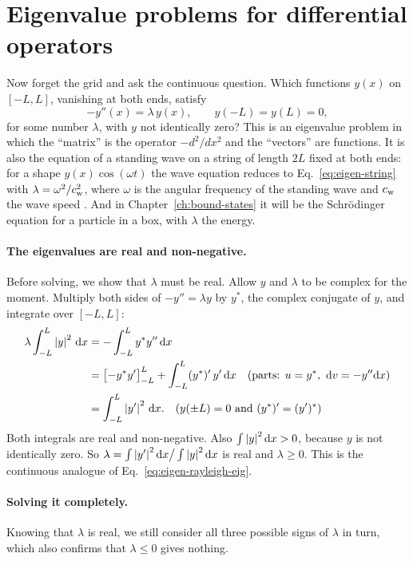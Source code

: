 \section{Eigenvalue problems for differential operators}\label{sec:eigen-ode}

Now forget the grid and ask the continuous question. Which functions $y(x)$ on $[-L,L]$, vanishing at both ends, satisfy
\begin{equation}
-y''(x)=\lambda\,y(x),\qquad y(-L)=y(L)=0,
\label{eq:eigen-string}
\end{equation}
for some number $\lambda$, with $y$ not identically zero? This is an eigenvalue problem in which the ``matrix'' is the operator $-d^2/dx^2$ and the ``vectors'' are functions. It is also the equation of a standing wave on a string of length $2L$ fixed at both ends: for a shape $y(x)\cos(\omega t)$ the wave equation reduces to Eq.~\eqref{eq:eigen-string} with $\lambda=\omega^2/c_{\rm w}^2$, where $\omega$ is the angular frequency of the standing wave and $c_{\rm w}$ the wave speed \cite{hrw}. And in Chapter~\ref{ch:bound-states} it will be the Schr\"odinger equation for a particle in a box, with $\lambda$ the energy.

\paragraph{The eigenvalues are real and non-negative.} Before solving, we show that $\lambda$ must be real. Allow $y$ and $\lambda$ to be complex for the moment. Multiply both sides of $-y''=\lambda y$ by $y^*$, the complex conjugate of $y$, and integrate over $[-L,L]$:
\begin{align}
\lambda\int_{-L}^L\left\lvert y\right\rvert^2\,\mathrm{d} x&=-\int_{-L}^Ly^*y''\,\mathrm{d} x\\
&=\bigl[-y^*y'\bigr]_{-L}^{L}+\int_{-L}^L(y^*)'\,y'\,\mathrm{d} x\quad\text{(parts: }u=y^*,\ \mathrm{d} v=-y''\mathrm{d} x)\\
&=\int_{-L}^L\left\lvert y'\right\rvert^2\,\mathrm{d} x.\quad\text{(}y(\pm L)=0\text{ and }(y^*)'=(y')^*)
\end{align}
Both integrals are real and non-negative. Also $\int\left\lvert y\right\rvert^2\mathrm{d} x>0$, because $y$ is not identically zero. So $\lambda=\int\left\lvert y'\right\rvert^2\mathrm{d} x\big/\int\left\lvert y\right\rvert^2\mathrm{d} x$ is real and $\lambda\ge0$. This is the continuous analogue of Eq.~\eqref{eq:eigen-rayleigh-eig}.

\paragraph{Solving it completely.} Knowing that $\lambda$ is real, we still consider all three possible signs of $\lambda$ in turn, which also confirms that $\lambda\le0$ gives nothing.

